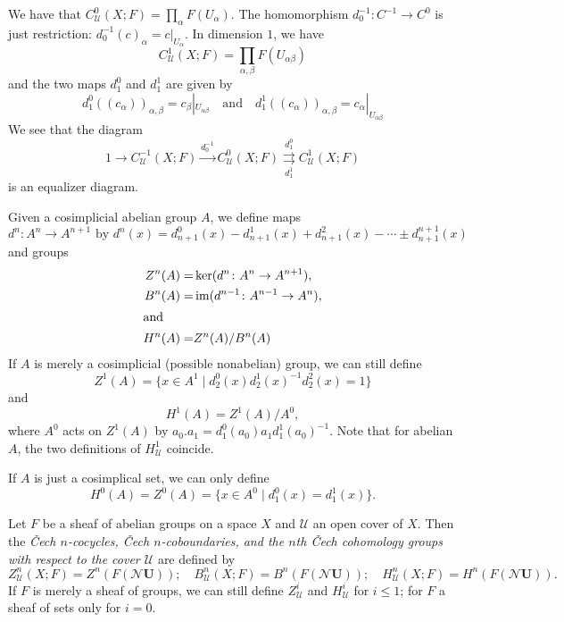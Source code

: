 \documentclass[a4paper,openany]{scrbook}
\newcommand{\nerve}{\mathcal N}
\begin{document}
\begin{example}
We have that $C^{0}_{\mathcal U}(X;F) = \prod_{\alpha} F(U_\alpha)$. The homomorphism $d^{-1}_0\colon C^{-1} \to C^0$ is just restriction: $d^{-1}_0(c)_{\alpha} = c|_{U_\alpha}$. In dimension $1$, we have
\[
C^1_{\mathcal U}(X;F) = \prod_{\alpha,\beta} F(U_{\alpha\beta})
\]
and the two maps $d^0_1$ and $d^1_1$ are given by
\[
d^0_1((c_\alpha))_{\alpha,\beta} = c_\beta|_{U_{\alpha\beta}} \quad \text{and} \quad d^1_1((c_\alpha))_{\alpha,\beta} = c_\alpha|_{U_{\alpha\beta}}
\]
We see that the diagram
\[
1 \to C^{-1}_{\mathcal U}(X;F) \xrightarrow{d^{-1}_0} C^{0}_{\mathcal U}(X;F) \overset{d^0_1}{\underset{d^1_1}{\rightrightarrows}} C^1_{\mathcal U}(X;F)
\]
is an equalizer diagram.
\end{example}

\begin{defn}
Given a cosimplicial abelian group $A$, we define maps
\[
d^n\colon A^{n} \to A^{n+1} \text{ by } d^n(x) = d^0_{n+1}(x)-d^1_{n+1}(x)+d^2_{n+1}(x)-\cdots\pm d^{n+1}_{n+1}(x)
\]
and groups
\begin{align*}
Z^n(A) =& \ker(d^n\colon A^n \to A^{n+1}),\\
B^n(A) =& \operatorname{im}(d^{n-1}\colon A^{n-1} \to A^{n}),\\
\intertext{and}
H^n(A) =& Z^n(A)/B^n(A)
\end{align*}
If $A$ is merely a cosimplicial (possible nonabelian) group, we can still define
\[
Z^1(A) = \{x \in A^1 \mid d^0_2(x)d^1_2(x)^{-1}d^2_2(x)=1\}
\]
and
\[
H^1(A) = Z^1(A)/A^0,
\]
where $A^0$ acts on $Z^1(A)$ by $a_0.a_1 = d^0_1(a_0) a_1 d^1_1(a_0)^{-1}$. Note that for abelian $A$, the two definitions of $H^1_{\mathcal U}$ coincide.

If $A$ is just a cosimplical set, we can only define
\[
H^0(A) = Z^0(A) = \{x \in A^0 \mid d^0_1(x) = d^1_1(x)\}.
\]
\end{defn}

\begin{defn}
Let $F$ be a sheaf of abelian groups on a space $X$ and $\mathcal U$ an open cover of $X$. Then the \emph{Čech $n$-cocycles, Čech $n$-coboundaries, and the $n$th Čech cohomology groups with respect to the cover $\mathcal U$} are defined by
\[
Z^n_{\mathcal U}(X;F) = Z^n(F(\nerve \mathbf U)); \quad B^n_{\mathcal U}(X;F) = B^n(F(\nerve \mathbf U)); \quad H^n_{\mathcal U}(X;F) = H^n(F(\nerve \mathbf U)).
\]
If $F$ is merely a sheaf of groups, we can still define $Z^i_{\mathcal U}$ and $H^i_{\mathcal U}$ for $i \leq 1$; for $F$ a sheaf of sets only for $i=0$.
\end{defn}
\end{document}
